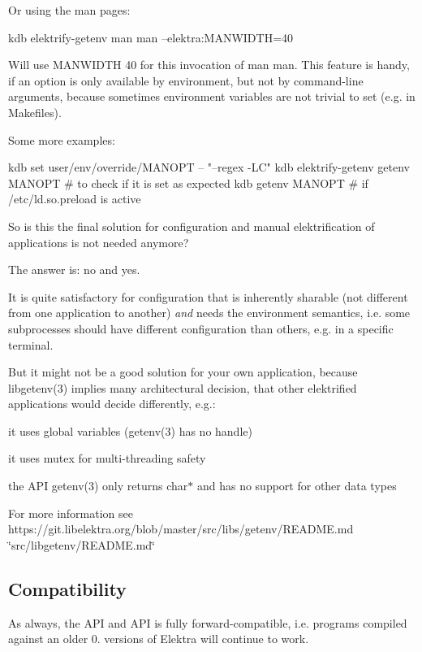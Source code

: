Or using the man pages\+: \begin{DoxyVerb}kdb elektrify-getenv man man --elektra:MANWIDTH=40
\end{DoxyVerb}


Will use M\+A\+N\+W\+I\+D\+TH 40 for this invocation of man man. This feature is handy, if an option is only available by environment, but not by command-\/line arguments, because sometimes environment variables are not trivial to set (e.\+g. in Makefiles).

Some more examples\+: \begin{DoxyVerb}kdb set user/env/override/MANOPT -- "--regex -LC"
kdb elektrify-getenv getenv MANOPT   # to check if it is set as expected
kdb getenv MANOPT   # if /etc/ld.so.preload is active
\end{DoxyVerb}


So is this the final solution for configuration and manual elektrification of applications is not needed anymore?

The answer is\+: no and yes.

It is quite satisfactory for configuration that is inherently sharable (not different from one application to another) {\itshape and} needs the environment semantics, i.\+e. some subprocesses should have different configuration than others, e.\+g. in a specific terminal.

But it might not be a good solution for your own application, because libgetenv(3) implies many architectural decision, that other elektrified applications would decide differently, e.\+g.\+:


\begin{DoxyItemize}
\item it uses global variables (getenv(3) has no handle)
\item it uses mutex for multi-\/threading safety
\item the A\+PI getenv(3) only returns {\ttfamily char$\ast$} and has no support for other data types
\end{DoxyItemize}

For more information see https\+://git.libelektra.\+org/blob/master/src/libs/getenv/\+R\+E\+A\+D\+ME.md \char`\"{}src/libgetenv/\+R\+E\+A\+D\+M\+E.\+md\char`\"{}

\subsection*{Compatibility}

As always, the A\+PI and A\+PI is fully forward-\/compatible, i.\+e. programs compiled against an older 0. versions of Elektra will continue to work.

